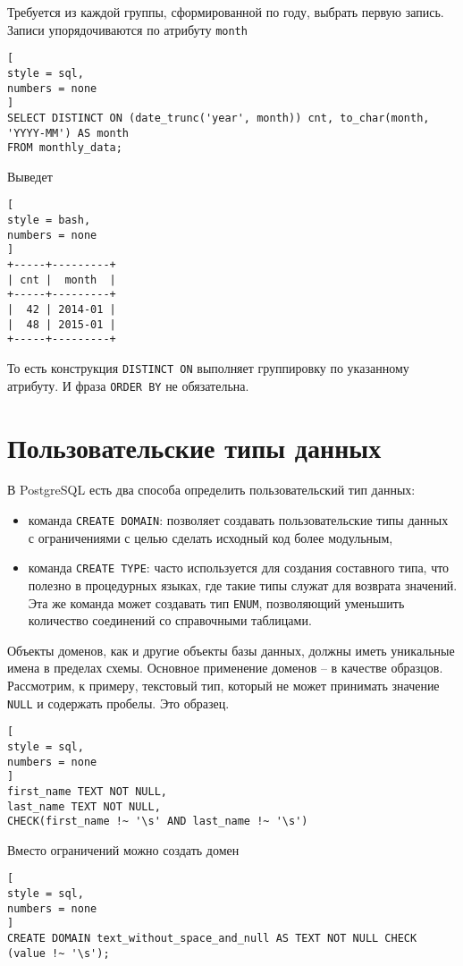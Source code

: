 \documentclass[%
	11pt,
	a4paper,
	utf8,
		]{article}
\begin{document}
Требуется из каждой группы, сформированной по году, выбрать первую запись. Записи упорядочиваются по атрибуту \texttt{month}
\begin{lstlisting}[
style = sql,
numbers = none
]
SELECT DISTINCT ON (date_trunc('year', month)) cnt, to_char(month, 'YYYY-MM') AS month 
FROM monthly_data;
\end{lstlisting}

Выведет
\begin{lstlisting}[
style = bash,
numbers = none
]
+-----+---------+
| cnt |  month  |
+-----+---------+
|  42 | 2014-01 |
|  48 | 2015-01 |
+-----+---------+
\end{lstlisting}

То есть конструкция \texttt{DISTINCT ON} выполняет группировку по указанному атрибуту. И фраза \texttt{ORDER BY} не обязательна.

\section{Пользовательские типы данных}

В PostgreSQL есть два способа определить пользовательский тип данных:
\begin{itemize}
	\item команда \texttt{CREATE DOMAIN}: позволяет создавать пользовательские типы данных с ограничениями с целью сделать исходный код более модульным,
	
	\item команда \texttt{CREATE TYPE}: часто используется для создания составного типа, что полезно в процедурных языках, где такие типы служат для возврата значений. Эта же команда может создавать тип \texttt{ENUM}, позволяющий уменьшить количество соединений со справочными таблицами.
\end{itemize}

Объекты доменов, как и другие объекты базы данных, должны иметь уникальные имена в пределах схемы. Основное применение доменов -- в качестве образцов. Рассмотрим, к примеру, текстовый тип, который не может принимать значение \texttt{NULL} и содержать пробелы. Это образец.
\begin{lstlisting}[
style = sql,
numbers = none
]
first_name TEXT NOT NULL,
last_name TEXT NOT NULL,
CHECK(first_name !~ '\s' AND last_name !~ '\s')
\end{lstlisting}

Вместо ограничений можно создать домен
\begin{lstlisting}[
style = sql,
numbers = none
]
CREATE DOMAIN text_without_space_and_null AS TEXT NOT NULL CHECK (value !~ '\s');
\end{lstlisting}
\end{document}

